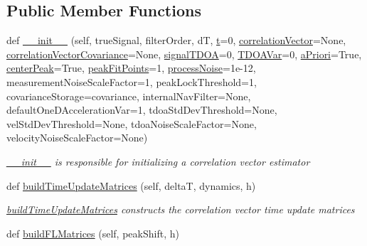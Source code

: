 \subsection*{Public Member Functions}
\begin{DoxyCompactItemize}
\item 
def \hyperlink{classmodest_1_1substates_1_1correlationvector_1_1CorrelationVector_a094103eb6a6bf7bbc118f86f03e1c885}{\+\_\+\+\_\+init\+\_\+\+\_\+} (self, true\+Signal, filter\+Order, dT, \hyperlink{classmodest_1_1substates_1_1correlationvector_1_1CorrelationVector_a127ca6c8eed6a2e822dbac7e83458bf3}{t}=0, \hyperlink{classmodest_1_1substates_1_1correlationvector_1_1CorrelationVector_a81da583ee9077067b6aaa354fd8a8c49}{correlation\+Vector}=None, \hyperlink{classmodest_1_1substates_1_1correlationvector_1_1CorrelationVector_a03bf36ec74d2fa70eeec14da348bec0c}{correlation\+Vector\+Covariance}=None, \hyperlink{classmodest_1_1substates_1_1correlationvector_1_1CorrelationVector_a95b97079287af509a5132e15e6107781}{signal\+T\+D\+OA}=0, \hyperlink{classmodest_1_1substates_1_1correlationvector_1_1CorrelationVector_a947c6d7fe9d0fffbb1e33e8dc0203bd9}{T\+D\+O\+A\+Var}=0, \hyperlink{classmodest_1_1substates_1_1correlationvector_1_1CorrelationVector_a9af2ca612576e52c84e98757e53085a8}{a\+Priori}=True, \hyperlink{classmodest_1_1substates_1_1correlationvector_1_1CorrelationVector_a9dbc1cdcfab963b133537b54f0a6d7a6}{center\+Peak}=True, \hyperlink{classmodest_1_1substates_1_1correlationvector_1_1CorrelationVector_af2be8d7129fd0453208af5268fdddc22}{peak\+Fit\+Points}=1, \hyperlink{classmodest_1_1substates_1_1correlationvector_1_1CorrelationVector_ab1756128cdec161ea22557d756745195}{process\+Noise}=1e-\/12, measurement\+Noise\+Scale\+Factor=1, peak\+Lock\+Threshold=1, covariance\+Storage=\textquotesingle{}covariance\textquotesingle{}, internal\+Nav\+Filter=\+None, default\+One\+D\+Acceleration\+Var=1, tdoa\+Std\+Dev\+Threshold=\+None, vel\+Std\+Dev\+Threshold=\+None, tdoa\+Noise\+Scale\+Factor=\+None, velocity\+Noise\+Scale\+Factor=\+None)
\begin{DoxyCompactList}\small\item\em \hyperlink{classmodest_1_1substates_1_1correlationvector_1_1CorrelationVector_a094103eb6a6bf7bbc118f86f03e1c885}{\+\_\+\+\_\+init\+\_\+\+\_\+} is responsible for initializing a correlation vector estimator \end{DoxyCompactList}\item 
def \hyperlink{classmodest_1_1substates_1_1correlationvector_1_1CorrelationVector_a3514ce57ec201ece8a5144f515d2d02c}{build\+Time\+Update\+Matrices} (self, deltaT, dynamics, h)
\begin{DoxyCompactList}\small\item\em \hyperlink{classmodest_1_1substates_1_1correlationvector_1_1CorrelationVector_a3514ce57ec201ece8a5144f515d2d02c}{build\+Time\+Update\+Matrices} constructs the correlation vector time update matrices \end{DoxyCompactList}\item 
def \hyperlink{classmodest_1_1substates_1_1correlationvector_1_1CorrelationVector_a5d2c66204bb06d01f9ec53f53b42f848}{build\+F\+L\+Matrices} (self, peak\+Shift, h)
\end{DoxyCompactItemize}
